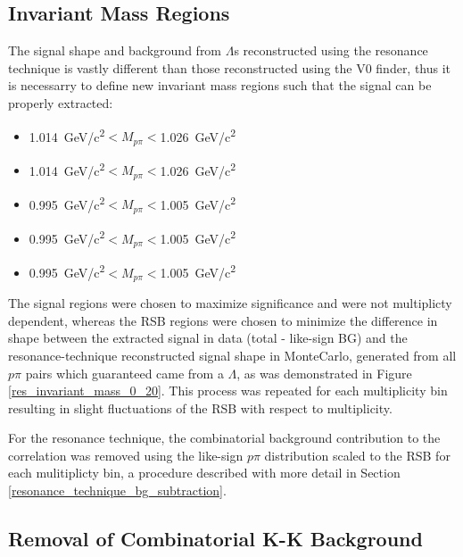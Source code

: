 \documentclass[ALICE,manyauthors]{ALICE_analysis_notes}
\begin{document}
\subsection{Invariant Mass Regions}

The signal shape and background from $\Lambda$s reconstructed using the resonance technique is vastly different than those reconstructed using the V0 finder, thus it is necessarry to define new invariant mass regions such that the signal can be properly extracted:

\begin{itemize}
	\item {}  \SI{1.014}{GeV/c^2}$< M_{p\pi} < $\SI{1.026}{GeV/c^2}
	\item {}  \SI{1.014}{GeV/c^2}$< M_{p\pi} < $\SI{1.026}{GeV/c^2}
	\item  {}  \SI{0.995}{GeV/c^2}$< M_{p\pi} < $\SI{1.005}{GeV/c^2}
	\item  {}  \SI{0.995}{GeV/c^2}$< M_{p\pi} < $\SI{1.005}{GeV/c^2}
	\item  {}  \SI{0.995}{GeV/c^2}$< M_{p\pi} < $\SI{1.005}{GeV/c^2}
\end{itemize}

The signal regions were chosen to maximize significance and were not multiplicty dependent, whereas the RSB regions were chosen to minimize the difference in shape between the extracted signal in data (total - like-sign BG) and the resonance-technique reconstructed signal shape in MonteCarlo, generated from all $p\pi$ pairs which guaranteed came from a $\Lambda$, as was demonstrated in Figure \ref{res_invariant_mass_0_20}. This process was repeated for each multiplicity bin resulting in slight fluctuations of the RSB with respect to multiplicity.

For the resonance technique, the combinatorial background contribution to the correlation was removed using the like-sign $p\pi$ distribution scaled to the RSB for each mulitiplicty bin, a procedure described with more detail in Section \ref{resonance_technique_bg_subtraction}.

\subsection{Removal of Combinatorial K-K Background}
\label{removecomb}
\end{document}
